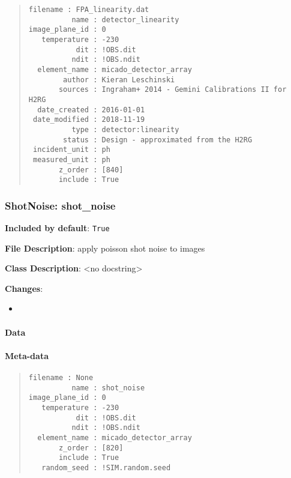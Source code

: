 \begin{quote}
\begin{alltt}
\begin{lstlisting}[frame=single]
      filename : FPA_linearity.dat
          name : detector_linearity
image_plane_id : 0
   temperature : -230
           dit : !OBS.dit
          ndit : !OBS.ndit
  element_name : micado_detector_array
        author : Kieran Leschinski
       sources : Ingraham+ 2014 - Gemini Calibrations II for H2RG
  date_created : 2016-01-01
 date_modified : 2018-11-19
          type : detector:linearity
        status : Design - approximated from the H2RG
 incident_unit : ph
 measured_unit : ph
       z_order : [840]
       include : True
\end{lstlisting}
\end{alltt}
\end{quote}


\subsubsection{ShotNoise: \textquotedbl{}shot\_noise\textquotedbl{}%
  \label{shotnoise-shot-noise}%
}

\textbf{Included by default}: \texttt{True}

\textbf{File Description}: apply poisson shot noise to images

\textbf{Class Description}: <no docstring>

\textbf{Changes}:

\begin{itemize}
\item \end{itemize}


\paragraph{Data%
  \label{id11}%
}


\paragraph{Meta-data%
  \label{id12}%
}

\begin{quote}
\begin{alltt}
\begin{lstlisting}[frame=single]
      filename : None
          name : shot_noise
image_plane_id : 0
   temperature : -230
           dit : !OBS.dit
          ndit : !OBS.ndit
  element_name : micado_detector_array
       z_order : [820]
       include : True
   random_seed : !SIM.random.seed
\end{lstlisting}
\end{alltt}
\end{quote}


